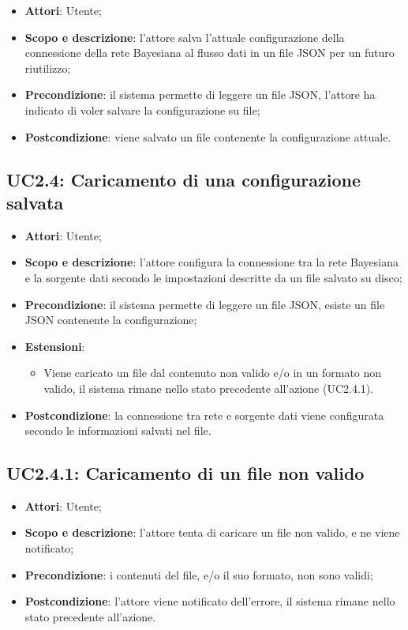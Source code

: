 \hypertarget{UC2.3}{}
\begin{itemize}
	\item \textbf{Attori}: Utente;
	\item \textbf{Scopo e descrizione}: l'attore salva l'attuale configurazione della connessione della rete Bayesiana al flusso dati in un file JSON per un futuro riutilizzo;
	\item \textbf{Precondizione}: il sistema permette di leggere un file JSON, l'attore ha indicato di voler salvare la configurazione su file;
	\item \textbf{Postcondizione}: viene salvato un file contenente la configurazione attuale.
\end{itemize}

\subsection{UC2.4: Caricamento di una configurazione salvata}
\hypertarget{UC2.4}{}
\begin{itemize}
	\item \textbf{Attori}: Utente;
	\item \textbf{Scopo e descrizione}: l'attore configura la connessione tra la rete Bayesiana e la sorgente dati secondo le impostazioni descritte da un file salvato su disco;
	\item \textbf{Precondizione}: il sistema permette di leggere un file JSON, esiste un file JSON contenente la configurazione;
	\item \textbf{Estensioni}: 
	\begin{itemize}
		\item  Viene caricato un file dal contenuto non valido e/o in un formato non valido, il sistema rimane nello stato precedente all'azione (UC2.4.1).
	\end{itemize}
	\item \textbf{Postcondizione}: la connessione tra rete e sorgente dati viene configurata secondo le informazioni salvati nel file.
\end{itemize}

\subsection{UC2.4.1: Caricamento di un file non valido}
\hypertarget{UC2.4.1}{}
\begin{itemize}
	\item \textbf{Attori}: Utente;
	\item \textbf{Scopo e descrizione}: l'attore tenta di caricare un file non valido, e ne viene notificato;
	\item \textbf{Precondizione}: i contenuti del file, e/o il suo formato, non sono validi;
	\item \textbf{Postcondizione}: l'attore viene notificato dell'errore, il sistema rimane nello stato precedente all'azione.
\end{itemize}

